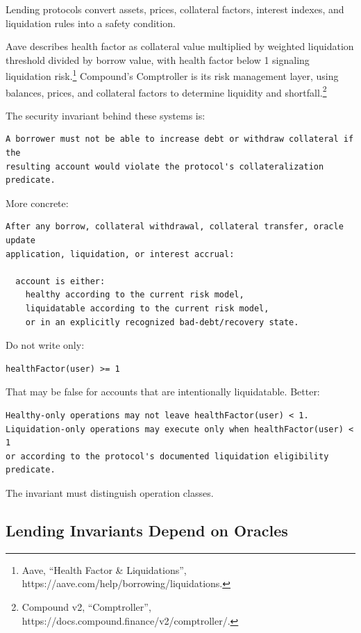 Lending protocols convert assets, prices, collateral factors, interest
indexes, and liquidation rules into a safety condition.

Aave describes health factor as collateral value multiplied by weighted
liquidation threshold divided by borrow value, with health factor below
1 signaling liquidation risk.\footnote{Aave, ``Health Factor \&
  Liquidations'', https://aave.com/help/borrowing/liquidations.}
Compound's Comptroller is its risk management layer, using balances,
prices, and collateral factors to determine liquidity and
shortfall.\footnote{Compound v2, ``Comptroller'',
  https://docs.compound.finance/v2/comptroller/.}

The security invariant behind these systems is:

\begin{lstlisting}
A borrower must not be able to increase debt or withdraw collateral if the
resulting account would violate the protocol's collateralization predicate.
\end{lstlisting}

More concrete:

\begin{lstlisting}
After any borrow, collateral withdrawal, collateral transfer, oracle update
application, liquidation, or interest accrual:

  account is either:
    healthy according to the current risk model,
    liquidatable according to the current risk model,
    or in an explicitly recognized bad-debt/recovery state.
\end{lstlisting}

Do not write only:

\begin{lstlisting}
healthFactor(user) >= 1
\end{lstlisting}

That may be false for accounts that are intentionally liquidatable.
Better:

\begin{lstlisting}
Healthy-only operations may not leave healthFactor(user) < 1.
Liquidation-only operations may execute only when healthFactor(user) < 1
or according to the protocol's documented liquidation eligibility predicate.
\end{lstlisting}

The invariant must distinguish operation classes.

\subsection{Lending Invariants Depend on Oracles}

